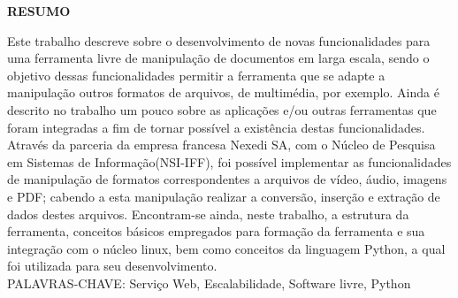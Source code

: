 \begin{center}
\textbf{RESUMO}
\end{center}
\singlespacing

\noindent Este trabalho descreve sobre o desenvolvimento de novas funcionalidades para uma ferramenta livre de manipulação de documentos em larga escala, sendo o objetivo dessas funcionalidades permitir a ferramenta que se adapte a manipulação outros formatos de arquivos, de multimédia, por exemplo. Ainda é descrito no trabalho um pouco sobre as aplicações e/ou outras ferramentas que foram integradas a fim de tornar possível a existência destas funcionalidades. Através da parceria da empresa francesa Nexedi SA, com o Núcleo de Pesquisa em Sistemas de Informação(NSI-IFF), foi possível implementar as funcionalidades de manipulação de formatos correspondentes a arquivos de vídeo, áudio, imagens e PDF; cabendo a esta manipulação realizar a conversão, inserção e extração de dados destes arquivos. Encontram-se ainda, neste trabalho, a estrutura da ferramenta, conceitos básicos empregados para formação da ferramenta e sua integração com o núcleo linux, bem como conceitos da linguagem Python, a qual foi utilizada para seu desenvolvimento. \\

\noindent PALAVRAS-CHAVE:  Serviço Web, Escalabilidade, Software livre, Python
